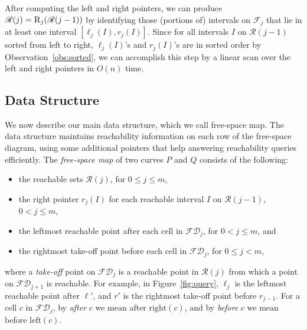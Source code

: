 \documentclass[12pt]{dalthesis}
\def\favoritefont{\bfseries \sffamily}
\def\QED{\ensuremath{{\Box}}}
\def\markatright#1{\leavevmode\unskip\nobreak\quad\hspace*{\fill}{#1}}
\newenvironment{proof}
	{\begin{trivlist}\item[\hskip\labelsep{\favoritefont Proof:}]}
	{\markatright{\QED}\end{trivlist}}
\newcommand{\qed}{}
\newcommand{\lee}{\leqslant}
\newcommand{\REM}[1]{}
\newcommand{\eq}{{\ \leftarrow\ }}
\newcommand{\CF}{{\mathscr F}}
\newcommand{\CR}{{\mathscr R}}
\newcommand{\Left}{\mbox{left}}
\newcommand{\Right}{\mbox{right}}
\newcommand{\fs}{free-space }
\newcommand{\FD}{\mathscr {FD}}
\newcommand{\nil}{\mbox{null}}
\newcommand{\Next}{\mbox{next}}
\newcommand{\Prev}{\mbox{prev}}
\newcommand{\F}{\CF}
\newcommand{\R}{\CR}
\newcommand{\RE}{\mbox{\sc R}}
\newcommand{\lp}{\ell}
\newcommand{\rp}{r}
\begin{document}
\begin{proof}
	After computing the left and right pointers, 
	we can produce $\R(j) = \RE_j(\R(j-1))$
	by identifying those (portions of) intervals on $\F_j$
	that lie in at least one interval $[\lp_j(I), \rp_j(I)]$.
	Since for all intervals $I$ on $\R(j-1)$ sorted from left to right, 
	$\lp_j(I)$'s and $\rp_j(I)$'s are in sorted order 
	by Observation~\ref{obs:sorted},
	we can accomplish this step by a linear scan over the 
	left and right pointers in $O(n)$ time.
	\qed
\end{proof}


\REM{
\begin{algorithm} [h]
\caption {\sc Compute-Pointers$(I)$} 
\label{alg:pointers}
\algsetup{indent=1.5em}
\begin{algorithmic}[1]
	\vspace{0.5em}
	\STATE let $p = $ orthogonal projection of $\Left(I)$ onto $\FD_j$ 
	\STATE $\ell \eq \Next(p)$
	\STATE $r \eq \Prev(q_k)$
	\IF {$\ell = \nil \text{ or } r = \nil \text{ or } \ell > r$}
		\STATE $\ell, r \eq \nil$ 
	\ENDIF
	\STATE set $\lp_j(I) \eq \ell, \rp_j(I) \eq r$ 
\end{algorithmic}
\end{algorithm}
}
\newpage
\subsection{Data Structure}

We now describe our main data structure, 
which we call \fs map.
The data structure maintains reachability information 
on each row of the \fs diagram, using some additional
pointers that help answering reachability queries efficiently. 
The \emph{\fs map} of two curves $P$ and $Q$
consists of the following:
\begin{itemize}
\item[(i)] the reachable sets $\R(j)$, for $0 \lee j \lee m$,
	\item[(ii)] the right pointer $\rp_{j}(I)$ for each reachable interval $I$ on $\R(j-1)$, $0 < j \lee m$,
	\item[(iii)] the leftmost reachable point after each cell in $\FD_j$, for $0 < j \lee m$, and
	\item[(iv)] the rightmost take-off point before each cell in $\FD_j$, for $0 \lee j < m$,
\end{itemize}
where a \emph{take-off} point on $\FD_j$ is a reachable point in $\R(j)$
from which a point on $\FD_{j+1}$ is reachable.
For example, in Figure~\ref{fig:query}, $\ell_j$ is the leftmost reachable point after $\ell'$,
and $r'$ is the rightmost take-off point before $r_{j-1}$.
For a cell $c$ in $\FD_j$, by \emph{after} $c$ we mean after $\Right(c)$,
and by \emph{before} $c$ we mean before $\Left(c)$.
\end{document}
